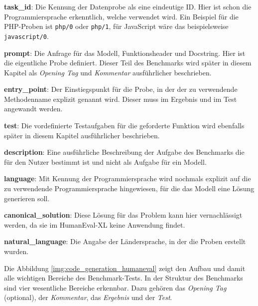 \begin{myenumerate}
	\item \textbf{task\_id}: Die Kennung der Datenprobe als eine eindeutige ID. Hier ist schon die Programmiersprache erkenntlich, welche verwendet wird. Ein Beispiel für die PHP-Proben ist \texttt{php/0} oder \texttt{php/1}, für JavaScript wäre das beispielsweise \texttt{javascript/0}.
	\item \textbf{prompt}: Die Anfrage für das Modell, Funktionsheader und Docstring. Hier ist die eigentliche Probe definiert. Dieser Teil des Benchmarks wird später in diesem Kapitel als \textit{Opening Tag} und \textit{Kommentar} ausführlicher beschrieben.
	\item \textbf{entry\_point}: Der Einstiegspunkt für die Probe, in der der zu verwendende Methodenname explizit genannt wird. Dieser muss im Ergebnis und im Test angewandt werden.
	\item \textbf{test}: Die vordefinierte Testaufgaben für die geforderte Funktion wird ebenfalls später in diesem Kapitel ausführlicher beschrieben.
	\item \textbf{description}: Eine ausführliche Beschreibung der Aufgabe des Benchmarks die für den Nutzer bestimmt ist und nicht als Aufgabe für ein Modell.
	\item \textbf{language}: Mit Kennung der Programmiersprache wird nochmals explizit auf die zu verwendende Programmiersprache hingewiesen, für die das Modell eine Lösung generieren soll.
	\item \textbf{canonical\_solution}: Diese Lösung für das Problem kann hier vernachlässigt werden, da sie im HumanEval-XL keine Anwendung findet.
	\item \textbf{natural\_language}: Die Angabe der Ländersprache, in der die Proben erstellt wurden.
\end{myenumerate}

Die Abbildung \ref{img:code_generation_humaneval} zeigt den Aufbau und damit alle wichtigen Bereiche des Benchmark-Tests. In der Struktur des Benchmarks sind vier wesentliche Bereiche erkennbar. Dazu gehören das \textit{Opening Tag} (optional), der \textit{Kommentar}, das \textit{Ergebnis} und der \textit{Test}.\vspace{0.2cm}

